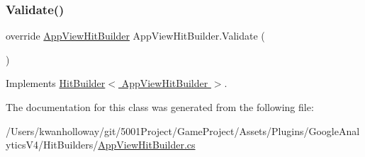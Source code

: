 \subsubsection{\texorpdfstring{Validate()}{Validate()}}
{\footnotesize\ttfamily override \hyperlink{class_app_view_hit_builder}{App\+View\+Hit\+Builder} App\+View\+Hit\+Builder.\+Validate (\begin{DoxyParamCaption}{ }\end{DoxyParamCaption})\hspace{0.3cm}{\ttfamily [virtual]}}



Implements \hyperlink{class_hit_builder_a0f4833828bd530bb057c9ca359584bce}{Hit\+Builder$<$ App\+View\+Hit\+Builder $>$}.



The documentation for this class was generated from the following file\+:\begin{DoxyCompactItemize}
\item 
/\+Users/kwanholloway/git/5001\+Project/\+Game\+Project/\+Assets/\+Plugins/\+Google\+Analytics\+V4/\+Hit\+Builders/\hyperlink{_app_view_hit_builder_8cs}{App\+View\+Hit\+Builder.\+cs}\end{DoxyCompactItemize}
